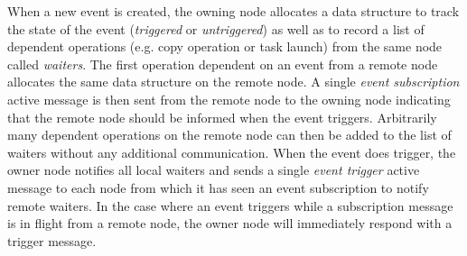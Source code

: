 When a new event is created, the owning node allocates a data structure to track the state of
the event ({\em triggered} or {\em untriggered}) as well as to record a list of dependent operations
(e.g. copy operation or task launch) from the same node called {\em waiters}.
The first operation dependent on an event
from a remote node allocates the same data structure on the remote node.  A single
{\em event subscription} active message is then sent from the remote node to the owning node indicating
that the remote node should be informed when the event triggers.  Arbitrarily many dependent operations on
the remote node can then be added to the list of waiters without any additional communication.
When the event does trigger, the owner node notifies all local waiters and
sends a single {\em event trigger} active message to each node from which it has seen an event subscription
to notify remote waiters.
In the case where an event triggers while a subscription message is in flight from a remote node, the owner node will
immediately respond with a trigger message.

